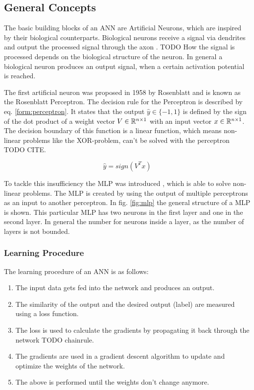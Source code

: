 \subsection{General Concepts}
\label{sec:deep_basics}

The basic building blocks of an \ac{ANN} are Artificial Neurons, which are inspired by  their biological counterparts.
Biological neurons receive a signal via dendrites and output the processed signal through the axon \cite{bioneuron}.
TODO How the signal is processed depends on the biological structure of the neuron.
In general a biological neuron produces an output signal, when a certain activation potential is reached.

The first artificial neuron was proposed in 1958 by Rosenblatt \cite{perceptron} and is known as the Rosenblatt Perceptron.
The decision rule for the Perceptron is described by eq. \ref{form:perceptron}.
It states that the output $\hat{y} \in \{-1, 1\}$ is defined by the sign of the dot product of a weight vector $V \in \mathbb{R}^{n \times 1}$ with an input vector $x \in \mathbb{R}^{n \times 1}$.
The decision boundary of this function is a linear function, which means non-linear problems like the XOR-problem, can't be solved with the perceptron TODO CITE.

\begin{equation}
    \hat{y} = sign(V^Tx)
    \label{form:perceptron}
\end{equation}

To tackle this insufficiency the \ac{MLP} was introduced \cite{mlp}, which is able to solve non-linear problems.
The \ac{MLP} is created by using the output of multiple perceptrons as an input to another perceptron.
In fig. \ref{fig:mlp} the general structure of a \ac{MLP} is shown.
This particular \ac{MLP} has two neurons in the first layer and one in the second layer.
In general the number for neurons inside a layer, as the number of layers is not bounded.

\subsubsection{Learning Procedure}
The learning procedure of an \ac{ANN} is as follows:

\begin{enumerate}
    \item The input data gets fed into the network and produces an output.
    \item The similarity of the output and the desired output (label) are measured using a loss function.
    \item The loss is used to calculate the gradients by propagating it back through the network TODO chainrule.
    \item The gradients are used in a gradient descent algorithm to update and optimize the weights of the network.
    \item The above is performed until the weights don't change anymore.
\end{enumerate}

